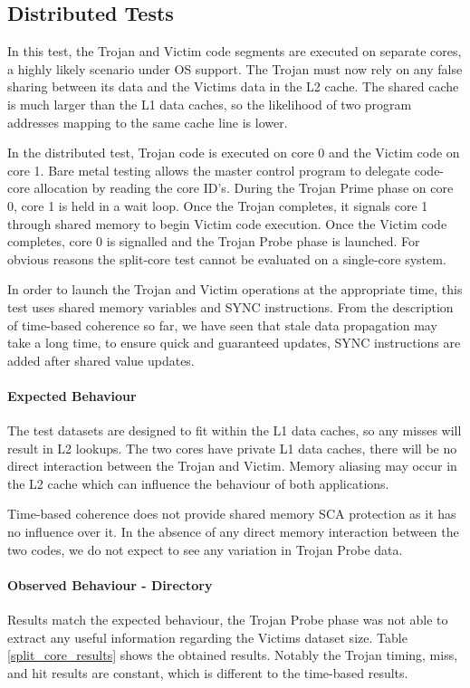 \clearpage
		\subsection{Distributed Tests}
			In this test, the Trojan and Victim code segments are executed on separate cores, a highly likely scenario under OS support. The Trojan must now rely on any false sharing between its data and the Victims data in the L2 cache. The shared cache is much larger than the L1 data caches, so the likelihood of two program addresses mapping to the same cache line is lower.

			In the distributed test, Trojan code is executed on core 0 and the Victim code on core 1. Bare metal testing allows the master control program to delegate code-core allocation by reading the core ID's. During the Trojan Prime phase on core 0, core 1 is held in a wait loop. Once the Trojan completes, it signals core 1 through shared memory to begin Victim code execution. Once the Victim code completes, core 0 is signalled and the Trojan Probe phase is launched. For obvious reasons the split-core test cannot be evaluated on a single-core system.

			In order to launch the Trojan and Victim operations at the appropriate time, this test uses shared memory variables and SYNC instructions. From the description of time-based coherence so far, we have seen that stale data propagation may take a long time, to ensure quick and guaranteed updates, SYNC instructions are added after shared value updates.
			
			\paragraph{Expected Behaviour}
				The test datasets are designed to fit within the L1 data caches, so any misses will result in L2 lookups. The two cores have private L1 data caches, there will be no direct interaction between the Trojan and Victim. Memory aliasing may occur in the L2 cache which can influence the behaviour of both applications. 
				
				Time-based coherence does not provide shared memory SCA protection as it has no influence over it. In the absence of any direct memory interaction between the two codes, we do not expect to see any variation in Trojan Probe data.

			\paragraph{Observed Behaviour - Directory}
				Results match the expected behaviour, the Trojan Probe phase was not able to extract any useful information regarding the Victims dataset size. Table \ref{split_core_results} shows the obtained results. Notably the Trojan timing, miss, and hit results are constant, which is different to the time-based results.
				
